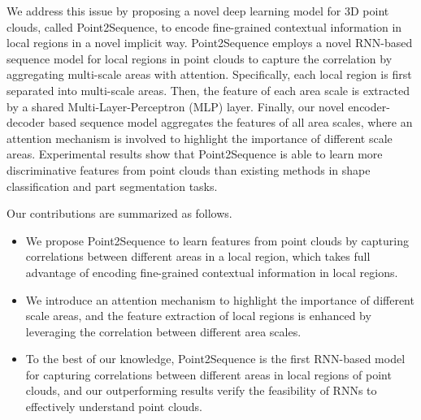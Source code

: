 \documentclass[letterpaper]{article}
\begin{document}
We address this issue by proposing a novel deep learning model for 3D point clouds, called Point2Sequence, to encode fine-grained contextual information in local regions in a novel implicit way.
Point2Sequence employs a novel RNN-based sequence model for local regions in point clouds to capture the correlation by aggregating multi-scale areas with attention.
Specifically, each local region is first separated into multi-scale areas. 
Then, the feature of each area scale is extracted by a shared Multi-Layer-Perceptron (MLP) layer.
Finally, our novel encoder-decoder based sequence model aggregates the features of all area scales, where an attention mechanism is involved to highlight the importance of different scale areas.  
Experimental results show that Point2Sequence is able to learn more discriminative features from point clouds than existing methods in shape classification and part segmentation tasks.



Our contributions are summarized as follows.
\begin{itemize}
\item 
We propose Point2Sequence to learn features from point clouds by capturing correlations between different areas in a local region, which takes full advantage of encoding fine-grained contextual information in local regions. 
\item We introduce an attention mechanism to highlight the importance of different scale areas, and the feature extraction of local regions is enhanced by leveraging the correlation between different area scales.  
\item To the best of our knowledge, Point2Sequence is the first RNN-based model for capturing correlations between different areas in local regions of point clouds, and our outperforming results verify the feasibility of RNNs to effectively understand point clouds.
\end{itemize}
\end{document}
